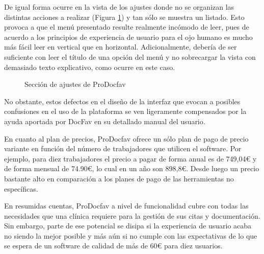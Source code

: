 De igual forma ocurre en la vista de los ajustes donde no se organizan las distintas acciones a realizar (Figura \ref{fig:ajustes-docfav}) y tan sólo se muestra un listado. Esto provoca a que el menú presentado resulte realmente incómodo de leer, pues de acuerdo a los principios de experiencia de usuario \cite{Scott2009-dh} para el ojo humano es mucho más fácil leer en vertical que en horizontal. Adicionalmente, debería de ser suficiente con leer el título de una opción del menú y no sobrecargar la vista con demasiado texto explicativo, como ocurre en este caso. 

\begin{figure}[H]
    \caption{Sección de ajustes de ProDocfav}
    \label{fig:ajustes-docfav}
\end{figure}

No obstante, estos defectos en el diseño de la interfaz que evocan a posibles confusiones en el uso de la plataforma se ven ligeramente compensados por la ayuda aportada por DocFav en su detallado manual del usuario. \bigskip

En cuanto al plan de precios, ProDocfav ofrece un sólo plan de pago de precio variante en función del número de trabajadores que utilicen el software. Por ejemplo, para diez trabajadores el precio a pagar de forma anual es de 749,04€ y de forma mensual de 74.90€, lo cual en un año son 898,8€. Desde luego un precio bastante alto en comparación a los planes de pago de las herramientas no específicas. \bigskip

En resumidas cuentas, ProDocfav a nivel de funcionalidad cubre con todas las necesidades que una clínica requiere para la gestión de sus citas y documentación. Sin embargo, parte de ese potencial se disipa si la experiencia de usuario acaba no siendo la mejor posible y más aún si no cumple con las expectativas de lo que se espera de un software de calidad de más de 60€ para diez usuarios. 

